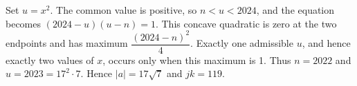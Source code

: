 Set $u=x^2$. The common value is positive, so $n<u<2024$, and the equation becomes $(2024-u)(u-n)=1$. This concave quadratic is zero at the two endpoints and has maximum $\dfrac{(2024-n)^2}{4}$. Exactly one admissible $u$, and hence exactly two values of $x$, occurs only when this maximum is 1. Thus $n=2022$ and $u=2023=17^2\cdot7$. Hence $|a|=17\sqrt7$ and $\boxed{jk=119}$.

